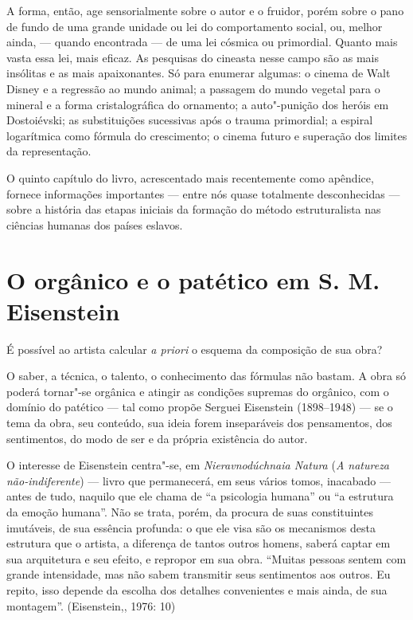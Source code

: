 A forma, então, age sensorialmente sobre o autor e o fruidor, porém
sobre o pano de fundo de uma grande unidade ou lei do comportamento
social, ou, melhor ainda, --- quando encontrada --- de uma lei cósmica ou
primordial. Quanto mais vasta essa lei, mais eficaz. As pesquisas do
cineasta nesse campo são as mais insólitas e as mais apaixonantes. Só
para enumerar algumas: o cinema de Walt Disney e a regressão ao mundo
animal; a passagem do mundo vegetal para o mineral e a forma
cristalográfica do ornamento; a auto"-punição dos heróis em Dostoiévski;
as substituições sucessivas após o trauma primordial; a espiral
logarítmica como fórmula do crescimento; o cinema futuro e superação dos
limites da representação.

O quinto capítulo do livro, acrescentado mais recentemente como
apêndice, fornece informações importantes --- entre nós quase totalmente
desconhecidas --- sobre a história das etapas iniciais da formação do
método estruturalista nas ciências humanas dos países eslavos.

\chapter{O orgânico e o patético em S. M. Eisenstein}

É possível ao artista calcular \emph{a priori} o esquema da composição
de sua obra?

O saber, a técnica, o talento, o conhecimento das fórmulas não bastam. A
obra só poderá tornar"-se orgânica e atingir as condições supremas do
orgânico, com o domínio do patético --- tal como propõe Serguei Eisenstein
(1898--1948) --- se o tema da obra, seu conteúdo, sua ideia forem
inseparáveis dos pensamentos, dos sentimentos, do modo de ser e da
própria existência do autor.

O interesse de Eisenstein centra"-se, em \emph{Nieravnodúchnaia Natura}
(\emph{A natureza não-indiferente}) --- livro que permanecerá, em
seus vários tomos, inacabado --- antes de tudo, naquilo que ele chama de
``a psicologia humana'' ou ``a estrutura da emoção humana''. Não se trata,
porém, da procura de suas constituintes imutáveis, de sua essência
profunda: o que ele visa são os mecanismos desta estrutura que o
artista, a diferença de tantos outros homens, saberá captar em sua
arquitetura e seu efeito, e repropor em sua obra. ``Muitas pessoas sentem com grande intensidade, mas não sabem transmitir
seus sentimentos aos outros. Eu repito, isso depende da escolha dos
detalhes convenientes e mais ainda, de sua montagem''. (Eisenstein,,
1976: 10)

